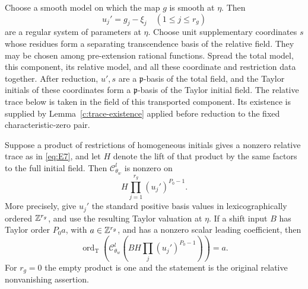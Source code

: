 Choose a smooth model on which the map $g$ is smooth at $\eta$.  Then
\[
 u_j'=g_j-\xi_j\quad(1\le j\le r_g)
\]
are a regular system of parameters at $\eta$.  Choose unit supplementary
coordinates $s$ whose residues form a separating transcendence basis of
the relative field.  They may be chosen among pre-extension rational
functions.  Spread the total model, this component, its relative model,
and all these coordinate and restriction data together.  After reduction,
$u',s$ are a $\mathfrak p$-basis of the total field, and the Taylor initials of these
coordinates form a $\mathfrak p$-basis of the Taylor initial field.  The relative
trace below is taken in the field of this transported component.  Its
existence is supplied by Lemma~\ref{c:trace-existence} applied before
reduction to the fixed characteristic-zero pair.

\begin{lemma}\label{c:trace-taylor-flags}
Suppose a product of restrictions of homogeneous initials gives a
nonzero relative trace as in \eqref{eq:E7}, and let $H$ denote the lift
of that product by the same factors to the full initial field.  Then
$\mathcal C^l_{\theta_w}$ is nonzero on
\begin{equation}\label{eq:E9}
 H\prod_{j=1}^{r_g}(u_j')^{P_0-1}.
\end{equation}
More precisely, give $u_j'$ the standard positive basis values in
lexicographically ordered $\mathbb Z^{r_g}$, and use the resulting Taylor valuation
at $\eta$.  If a shift input $B$ has Taylor order $P_0a$, with
$a\in\mathbb Z^{r_g}$, and has a nonzero scalar leading coefficient, then
\[
 \operatorname{ord}_{\mathrm T}\left(
 \mathcal C^l_{\theta_w}\left(
 B H\prod_j(u_j')^{P_0-1}\right)\right)=a.
\]
For $r_g=0$ the empty product is one and the statement is the original
relative nonvanishing assertion.
\end{lemma}

